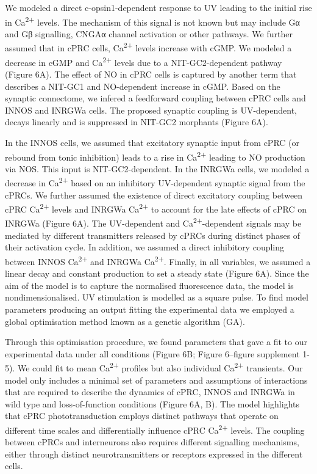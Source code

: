 \documentclass[
  10pt,
  onecolumn]{article}
\begin{document}
We modeled a direct c-opsin1-dependent response to UV leading to the
initial rise in Ca\textsuperscript{2+} levels. The mechanism of this
signal is not known but may include Gα and Gβ signalling, CNGAα channel
activation or other pathways. We further assumed that in cPRC cells,
Ca\textsuperscript{2+} levels increase with cGMP. We modeled a decrease
in cGMP and Ca\textsuperscript{2+} levels due to a NIT-GC2-dependent
pathway (Figure 6A). The effect of NO in cPRC cells is captured by
another term that describes a NIT-GC1 and NO-dependent increase in cGMP.
Based on the synaptic connectome, we infered a feedforward coupling
between cPRC cells and INNOS and INRGWa cells. The proposed synaptic
coupling is UV-dependent, decays linearly and is suppressed in NIT-GC2
morphants (Figure 6A).

In the INNOS cells, we assumed that excitatory synaptic input from cPRC
(or rebound from tonic inhibition) leads to a rise in
Ca\textsuperscript{2+} leading to NO production via NOS. This input is
NIT-GC2-dependent. In the INRGWa cells, we modeled a decrease in
Ca\textsuperscript{2+} based on an inhibitory UV-dependent synaptic
signal from the cPRCs. We further assumed the existence of direct
excitatory coupling between cPRC Ca\textsuperscript{2+} levels and
INRGWa Ca\textsuperscript{2+} to account for the late effects of cPRC on
INRGWa (Figure 6A). The UV-dependent and
Ca\textsuperscript{2+}-dependent signals may be mediated by different
transmitters released by cPRCs during distinct phases of their
activation cycle. In addition, we assumed a direct inhibitory coupling
between INNOS Ca\textsuperscript{2+} and INRGWa Ca\textsuperscript{2+}.
Finally, in all variables, we assumed a linear decay and constant
production to set a steady state (Figure 6A). Since the aim of the model
is to capture the normalised fluorescence data, the model is
nondimensionalised. UV stimulation is modelled as a square pulse. To
find model parameters producing an output fitting the experimental data
we employed a global optimisation method known as a genetic algorithm
(GA).

Through this optimisation procedure, we found parameters that gave a fit
to our experimental data under all conditions (Figure 6B; Figure
6--figure supplement 1-5). We could fit to mean Ca\textsuperscript{2+}
profiles but also individual Ca\textsuperscript{2+} transients. Our
model only includes a minimal set of parameters and assumptions of
interactions that are required to describe the dynamics of cPRC, INNOS
and INRGWa in wild type and loss-of-function conditions (Figure 6A, B).
The model highlights that cPRC phototransduction employs distinct
pathways that operate on different time scales and differentially
influence cPRC Ca\textsuperscript{2+} levels. The coupling between cPRCs
and interneurons also requires different signalling mechanisms, either
through distinct neurotransmitters or receptors expressed in the
different cells.
\end{document}
